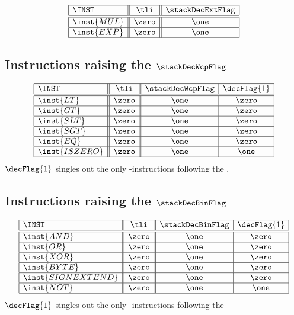 \[
\begin{array}{|l||c||c|}
	\hline
	\INST		& \tli	& \stackDecExtFlag	\\ \hline\hline
	\inst{MUL}	& \zero & \one			\\ \hline
	\inst{EXP}	& \zero & \one			\\ \hline
\end{array}
\]

\subsection{Instructions raising the $\stackDecWcpFlag$}
\label{hub: instruction handling: Wcp}

\[
\begin{array}{|l||c||c|c|}
	\hline
	\INST			& \tli	& \stackDecWcpFlag	& \decFlag{1}	\\ \hline\hline
	\inst{LT}		& \zero & \one			& \zero			\\ \hline
	\inst{GT}		& \zero & \one			& \zero			\\ \hline
	\inst{SLT}		& \zero & \one			& \zero			\\ \hline
	\inst{SGT}		& \zero & \one			& \zero			\\ \hline
	\inst{EQ}		& \zero & \one			& \zero			\\ \hline
	\inst{ISZERO}	& \zero & \one			& \one			\\ \hline
\end{array}
\]
\saNote{} $\decFlag{1}$ singles out the only \wcpMod{}-instructions following the \oneZeroSP{}.

\subsection{Instructions raising the $\stackDecBinFlag$}
\label{hub: instruction handling: Bin}

\[
\begin{array}{|l||c||c|c|}
	\hline
	\INST				& \tli	& \stackDecBinFlag	& \decFlag{1}	\\ \hline\hline
	\inst{AND}			& \zero	& \one			& \zero 		\\ \hline
	\inst{OR}			& \zero	& \one			& \zero 		\\ \hline
	\inst{XOR}			& \zero	& \one			& \zero 		\\ \hline
	\inst{BYTE}			& \zero	& \one			& \zero 		\\ \hline
	\inst{SIGNEXTEND}	& \zero	& \one			& \zero 		\\ \hline
	\inst{NOT}			& \zero	& \one			& \one			\\ \hline
\end{array}
\]
\saNote{} $\decFlag{1}$ singles out the only \binMod{}-instructions following the \oneZeroSP{}

